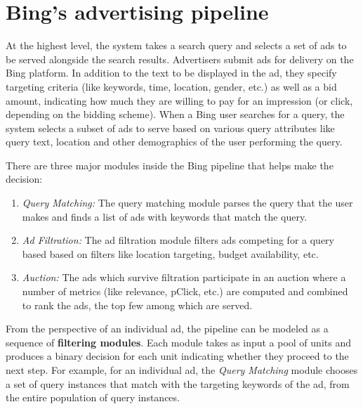 \documentclass[10pt, onecolumn]{report}
\begin{document}

\section{Bing's advertising pipeline}\label{sec:bing}

At the highest level, the system takes a search query
and selects a set of ads to be served alongside the search results. 
Advertisers submit ads for delivery on the Bing platform. In addition to the text
to be displayed in the ad, they 
specify targeting criteria (like keywords, time, location, gender, etc.) 
as well as a bid amount, indicating
how much they are willing to pay for an impression 
(or click, depending on the bidding scheme). 
When a Bing user searches for a query, the system selects a subset of
ads to serve based on various query attributes like query text, location and other 
demographics of the user performing the query.

There are three major modules inside the Bing pipeline that helps make the decision:
\begin{enumerate}
\item \emph{Query Matching:} The query matching module parses the query that the 
user makes and finds a list of ads with keywords that match the query. 
\item \emph{Ad Filtration:} The ad filtration module filters ads competing
for a query based based on filters like location targeting, budget availability, etc. 
\item \emph{Auction:} The ads which survive filtration participate in an auction where 
a number of metrics (like relevance, pClick, etc.) are computed and combined 
to rank the ads, the top few among which are served.
\end{enumerate}

From the perspective of an individual ad, the pipeline can be modeled 
as a sequence of \textbf{filtering modules}. Each module takes as input a pool of units
and produces a binary decision for each unit indicating whether they proceed to 
the next step. For example, for an individual ad, the \emph{Query Matching} module
chooses a set of query instances that match with the targeting keywords of the ad,
from the entire population of query instances. 
\end{document}
